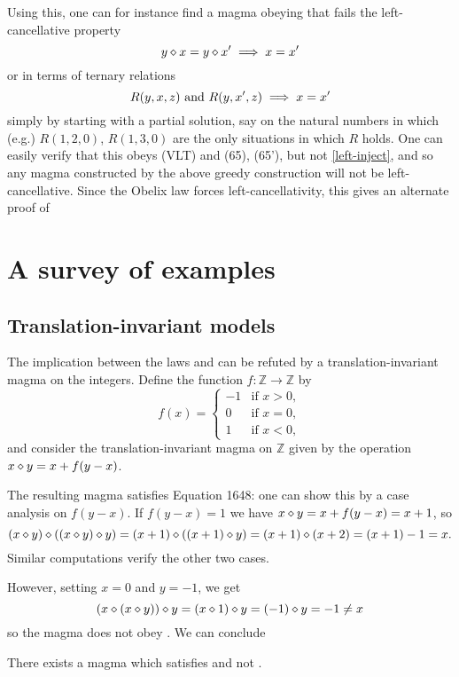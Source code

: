 Using this, one can for instance find a magma obeying  that fails the left-cancellative property
$$ y \diamond x = y \diamond x' \implies x=x'$$
or in terms of ternary relations
\begin{equation}\label{left-inject}
   R(y,x,z) \hbox{ and } R(y,x',z) \implies x=x'
\end{equation}
simply by starting with a partial solution, say on the natural numbers in which (e.g.) $R(1,2,0)$, $R(1,3,0)$ are the only situations in which $R$ holds.  One can easily verify that this obeys (VLT) and (65), (65'), but not \eqref{left-inject}, and so any magma constructed by the above greedy construction will not be left-cancellative.  Since the Obelix law  forces left-cancellativity, this gives an alternate proof of 


\section{A survey of examples}\label{infinite-examples-section}

\subsection{Translation-invariant models}

The implication between the laws  and  can be refuted by a translation-invariant
magma on the integers. Define the function $f: \mathbb{Z} \to \mathbb{Z}$ by
$$f(x) =
\begin{cases}
  -1  & \text{if } x > 0, \\
   0  & \text{if } x = 0, \\
   1  & \text{if } x < 0,
\end{cases}$$
and consider the translation-invariant magma on $\mathbb{Z}$ given by the operation $x \diamond y = x + f(y-x)$.

The resulting magma satisfies Equation 1648: one can show this by a case analysis on $f(y-x)$. If $f(y-x)=1$ we have $x \diamond y = x + f(y-x) = x + 1$, so
$$(x \diamond y) \diamond ((x \diamond y) \diamond y) = (x + 1) \diamond ((x + 1) \diamond y) = (x + 1) \diamond (x + 2) = (x + 1) - 1 = x.$$
Similar computations verify the other two cases.

However, setting $x=0$ and $y=-1$, we get
$$(x \diamond (x \diamond y)) \diamond y = (x \diamond 1) \diamond y = (-1) \diamond y = -1 \neq x$$
so the magma does not obey . We can conclude

\begin{theorem}\label{non_imp_1648_206_thm}
  \leanok
  There exists a magma which satisfies  and not .
\end{theorem}

